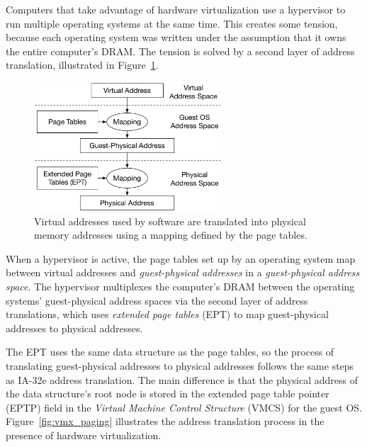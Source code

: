 
Computers that take advantage of hardware virtualization use a hypervisor to
run multiple operating systems at the same time. This creates some tension,
because each operating system was written under the assumption that it owns the
entire computer's DRAM. The tension is solved by a second layer of address
translation, illustrated in Figure~\ref{fig:vmx_address_translation}.

\begin{figure}[hbt]
  \centering
  \includegraphics[width=70mm]{figures/vmx_address_translation.pdf}
  \caption{
    Virtual addresses used by software are translated into physical memory
    addresses using a mapping defined by the page tables.
  }
  \label{fig:vmx_address_translation}
\end{figure}


When a hypervisor is active, the page tables set up by an operating system map
between virtual addresses and \textit{guest-physical addresses} in a
\textit{guest-physical address space}. The hypervisor multiplexes the
computer's DRAM between the operating systems' guest-physical address spaces
via the second layer of address translations, which uses \textit{extended page
tables} (EPT) to map guest-physical addresses to physical addresses.

The EPT uses the same data structure as the page tables, so the process of
translating guest-physical addresses to physical addresses follows the same
steps as IA-32e address translation. The main difference is that the physical
address of the data structure's root node is stored in the extended page table
pointer (EPTP) field in the \textit{Virtual Machine Control Structure} (VMCS)
for the guest OS. Figure~\ref{fig:vmx_paging} illustrates the address
translation process in the presence of hardware virtualization.

